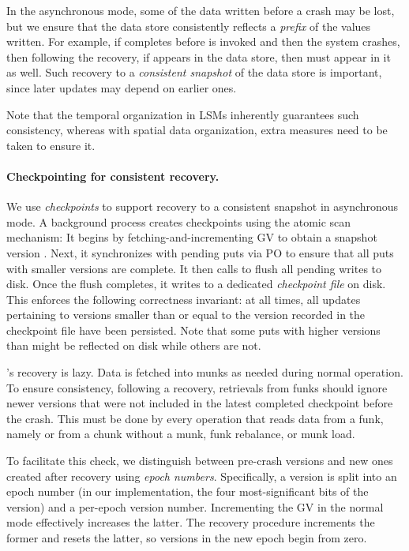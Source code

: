In the asynchronous mode, some of the  data written before a crash may be lost, but we  
ensure that the data store consistently reflects a \emph{prefix} of the  values written.
For example, if  completes before  
is invoked and then the system crashes, then following the recovery, 
if  appears in the data store, then  must appear in it as well. 
Such recovery to a \emph{consistent snapshot} of the data store is important, since later updates may depend on earlier ones. 

Note that the temporal organization in LSMs inherently guarantees such consistency, whereas with spatial data organization,
extra measures need to be taken to ensure it.

\paragraph{Checkpointing for consistent recovery.}

We use \emph{checkpoints} to support recovery to a consistent snapshot in asynchronous mode.
A background process creates checkpoints using the atomic scan mechanism:
It begins by fetching-and-incrementing GV to obtain a snapshot version .  Next, 
it synchronizes with pending puts via PO to ensure that all puts with smaller versions are complete. 
It then calls  to flush all pending writes to disk.
Once the flush completes, it writes  to a dedicated \emph{checkpoint file} on disk.
This enforces the following correctness invariant: at all times, all updates pertaining to versions smaller 
than or equal to the version recorded in the checkpoint file have been persisted.
Note that some puts with higher versions than  might be reflected on disk while others are not. 

\sys's recovery is lazy. 
Data is fetched into munks as needed during normal operation. 
To ensure consistency, following a recovery,  
retrievals from funks should ignore newer versions that were not included in the latest completed checkpoint before the crash. 
This must be done by every operation that reads data from a funk, namely  or  from a chunk without a munk, 
funk rebalance, or munk load. 

To facilitate this check, we distinguish between pre-crash versions and new ones created after recovery using \emph{epoch numbers}. 
Specifically, a version is split into an epoch number (in our implementation, the four most-significant bits of the version) and a per-epoch version number. 
Incrementing the GV in the normal mode effectively increases the latter.
The recovery procedure increments the former and resets the latter, so 
versions in the new epoch begin from zero. 

